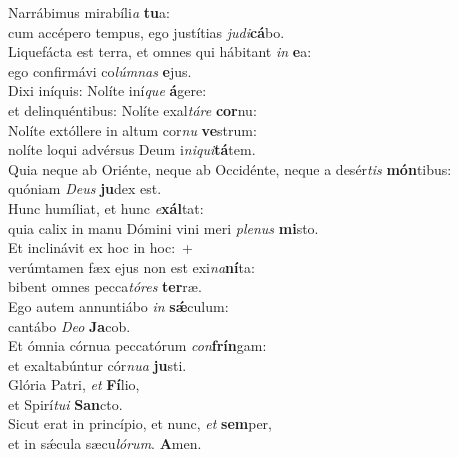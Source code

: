 \evenverse Narrábimus mirabíli\textit{a} \textbf{tu}a:~\*\\
\evenverse cum accépero tempus, ego justítias \textit{ju}\textit{di}\textbf{cá}bo.\\
\oddverse Liquefácta est terra, et omnes qui hábitant \textit{in} \textbf{e}a:~\*\\
\oddverse ego confirmávi co\textit{lúm}\textit{nas} \textbf{e}jus.\\
\evenverse Dixi iníquis: Nolíte iní\textit{que} \textbf{á}gere:~\*\\
\evenverse et delinquéntibus: Nolíte exal\textit{tá}\textit{re} \textbf{cor}nu:\\
\oddverse Nolíte extóllere in altum cor\textit{nu} \textbf{ve}strum:~\*\\
\oddverse nolíte loqui advérsus Deum i\textit{ni}\textit{qui}\textbf{tá}tem.\\
\evenverse Quia neque ab Oriénte, neque ab Occidénte, neque a desér\textit{tis} \textbf{món}tibus:~\*\\
\evenverse quóniam \textit{De}\textit{us} \textbf{ju}dex est.\\
\oddverse Hunc humíliat, et hunc \textit{e}\textbf{xál}tat:~\*\\
\oddverse quia calix in manu Dómini vini meri \textit{ple}\textit{nus} \textbf{mi}sto.\\
\evenverse Et inclinávit ex hoc in hoc:~+\\
\evenverse  verúmtamen fæx ejus non est exi\textit{na}\textbf{ní}ta:~\*\\
\evenverse bibent omnes pecca\textit{tó}\textit{res} \textbf{ter}ræ.\\
\oddverse Ego autem annuntiábo \textit{in} \textbf{sǽ}culum:~\*\\
\oddverse cantábo \textit{De}\textit{o} \textbf{Ja}cob.\\
\evenverse Et ómnia córnua peccatórum \textit{con}\textbf{frín}gam:~\*\\
\evenverse et exaltabúntur cór\textit{nu}\textit{a} \textbf{ju}sti.\\
\oddverse Glória Patri, \textit{et} \textbf{Fí}lio,~\*\\
\oddverse et Spirí\textit{tu}\textit{i} \textbf{San}cto.\\
\evenverse Sicut erat in princípio, et nunc, \textit{et} \textbf{sem}per,~\*\\
\evenverse et in sǽcula sæcu\textit{ló}\textit{rum}. \textbf{A}men.\\
